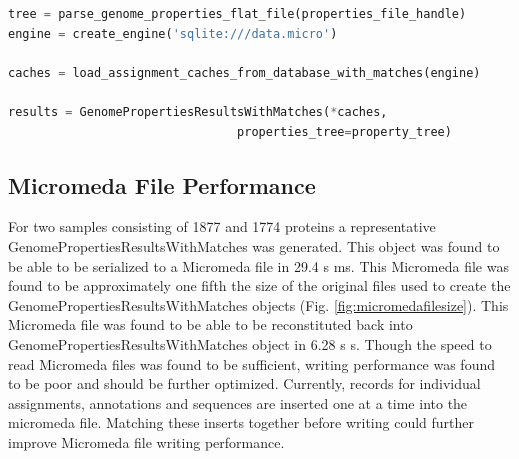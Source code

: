 \begin{lstlisting}[language=Python]  
tree = parse_genome_properties_flat_file(properties_file_handle)
engine = create_engine('sqlite:///data.micro')

caches = load_assignment_caches_from_database_with_matches(engine)

results = GenomePropertiesResultsWithMatches(*caches,          
                                properties_tree=property_tree)
\end{lstlisting}

\subsection{Micromeda File Performance}

For two samples consisting of 1877 and 1774 proteins a representative GenomePropertiesResultsWithMatches was generated. This object was found to be able to be serialized to a Micromeda file in 29.4 s  ms. This Micromeda file was found to be approximately one fifth the size of the original files used to create the GenomePropertiesResultsWithMatches objects (Fig. \ref{fig:micromedafilesize}). This Micromeda file was found to be able to be reconstituted back into GenomePropertiesResultsWithMatches object in 6.28 s  s. Though the speed to read Micromeda files was found to be sufficient, writing performance was found to be poor and should be further optimized. Currently, records for individual assignments, annotations and sequences are inserted one at a time into the micromeda file. Matching these inserts together before writing could further improve Micromeda file writing performance.


